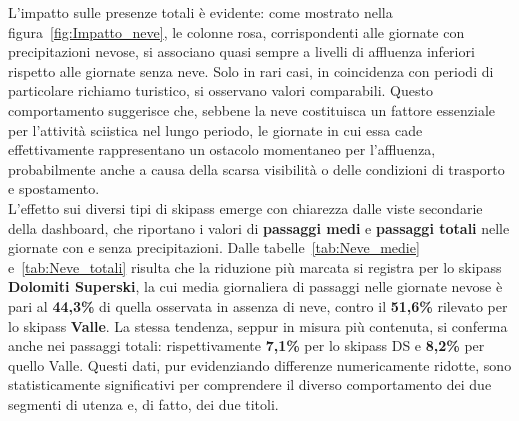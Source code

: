 L’impatto sulle presenze totali è evidente: come mostrato nella figura~\ref{fig:Impatto_neve}, le colonne rosa, corrispondenti alle giornate con precipitazioni nevose, si associano quasi sempre a livelli di affluenza inferiori rispetto alle giornate senza neve.  
Solo in rari casi, in coincidenza con periodi di particolare richiamo turistico, si osservano valori comparabili.  
Questo comportamento suggerisce che, sebbene la neve costituisca un fattore essenziale per l’attività sciistica nel lungo periodo, le giornate in cui essa cade effettivamente rappresentano un ostacolo momentaneo per l’affluenza, probabilmente anche a causa della scarsa visibilità o delle condizioni di trasporto e spostamento.\\

L’effetto sui diversi tipi di skipass emerge con chiarezza dalle viste secondarie della dashboard, che riportano i valori di \textbf{passaggi medi} e \textbf{passaggi totali} nelle giornate con e senza precipitazioni.  
Dalle tabelle~\ref{tab:Neve_medie} e~\ref{tab:Neve_totali} risulta che la riduzione più marcata si registra per lo skipass \textbf{Dolomiti Superski}, la cui media giornaliera di passaggi nelle giornate nevose è pari al \textbf{44,3\%} di quella osservata in assenza di neve, contro il \textbf{51,6\%} rilevato per lo skipass \textbf{Valle}.  
La stessa tendenza, seppur in misura più contenuta, si conferma anche nei passaggi totali: rispettivamente \textbf{7,1\%} per lo skipass DS e \textbf{8,2\%} per quello Valle.  
Questi dati, pur evidenziando differenze numericamente ridotte, sono statisticamente significativi per comprendere il diverso comportamento dei due segmenti di utenza e, di fatto, dei due titoli.\\

